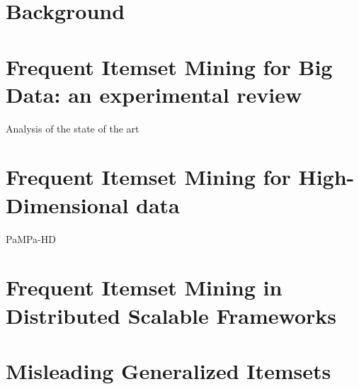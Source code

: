 \documentclass[11pt, a4paper, oneside]{Thesis} %
\begin{document}
\chapter{Background}\label{background}


\chapter{Frequent Itemset Mining for Big Data: an experimental review}
Analysis of the state of the art
\chapter {Frequent Itemset Mining for High-Dimensional data}
PaMPa-HD
\chapter{Frequent Itemset Mining in Distributed Scalable Frameworks}
\chapter{Misleading Generalized Itemsets}



\clearpage




\end{document}
